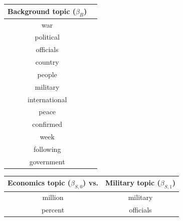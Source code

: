 \begin{figure}
  \center
\begin{tabular}{|c|c|}
  \hline
  \textbf{Background topic ($\beta_{B}$)} \\
  \hline
  war \\
  political \\
  officials \\
  country \\
  people \\
  military \\
  international \\
  peace \\
  confirmed \\
  week \\
  following \\
  government \\
  \hline
\end{tabular}
\hspace{30pt} \begin{tabular}{|cc|}
  \hline
  \textbf{Economics topic ($\beta_{S,0}$) vs.} &
  \textbf{Military topic ($\beta_{S,1}$)} \\
  \hline
  million & military \\
  percent & officials \\

\end{tabular}
\end{figure}
